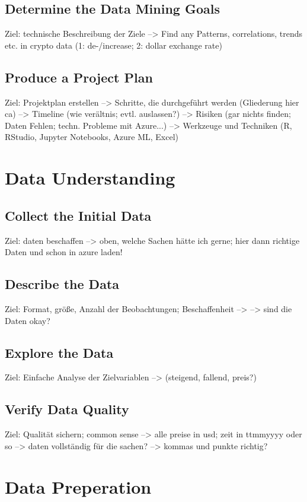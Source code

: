 \subsection{Determine the Data Mining Goals}
Ziel: technische Beschreibung der Ziele
--> Find any Patterns, correlations, trends etc. in crypto data (1: de-/increase; 2: dollar exchange rate)

\subsection{Produce a Project Plan}
Ziel: Projektplan erstellen
--> Schritte, die durchgeführt werden (Gliederung hier ca)
--> Timeline (wie verältnis; evtl. auslassen?)
--> Risiken (gar nichts finden; Daten Fehlen; techn. Probleme mit Azure...)
--> Werkzeuge und Techniken (R, RStudio, Jupyter Notebooks, Azure ML, Excel)

\section{Data Understanding}
\subsection{Collect the Initial Data}
Ziel: daten beschaffen
--> oben, welche Sachen hätte ich gerne; hier dann richtige Daten und schon in azure laden!

\subsection{Describe the Data}
Ziel: Format, größe, Anzahl der Beobachtungen; Beschaffenheit
-->
--> sind die Daten okay? 

\subsection{Explore the Data}
Ziel: Einfache Analyse der Zielvariablen 
--> (steigend, fallend, preis?)

\subsection{Verify Data Quality}
Ziel: Qualität sichern; common sense
--> alle preise in usd; zeit in ttmmyyyy oder so
--> daten vollständig für die sachen?
--> kommas und punkte richtig?

\section{Data Preperation}
